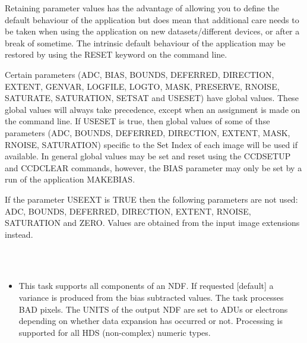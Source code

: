 \documentclass[twoside,11pt]{article}
\newcommand{\htmlref}[2]{#1}
\renewcommand{\_}{\texttt{\symbol{95}}}
\newcommand{\xroutine}[1]{\htmlref{{\sc #1}}{#1}}
\newcommand{\sstimplementationstatus}[1]{
   \item[{Implementation Status:}] \mbox{} \\[1.3ex] #1}
\newcommand{\sstitemlist}[1]{
  \mbox{} \\
  \vspace{-3.5ex}
  \begin{itemize}
     #1
  \end{itemize}
}
\newcommand{\sstitem}{\item}
\newcommand{\sstimplementationstatus}[1]{
      \item[Implementation Status:] #1
   }
\newcommand{\sstitemlist}[1]{
      \begin{itemize}
         #1
      \end{itemize}
      \\
   }
\newcommand{\sstitem}{\item}
\begin{document}
{{{      }
      Retaining parameter values has the advantage of allowing you to
      define the default behaviour of the application but does mean
      that additional care needs to be taken when using the application
      on new datasets/different devices, or after a break of sometime.
      The intrinsic default behaviour of the application may be
      restored by using the RESET keyword on the command line.

      Certain parameters (ADC, BIAS, BOUNDS, DEFERRED, DIRECTION,
      EXTENT, GENVAR, LOGFILE, LOGTO, MASK, PRESERVE, RNOISE, SATURATE,
      SATURATION, SETSAT and USESET) have global values. These global values
      will always take precedence, except when an assignment is made on
      the command line.  If USESET is true, then global values of
      some of thse parameters (ADC, BOUNDS, DEFERRED, DIRECTION, EXTENT,
      MASK, RNOISE, SATURATION) specific to the Set Index of each image
      will be used if available.  In general global values may be set and reset
      using the \xroutine{CCDSETUP} and \xroutine{CCDCLEAR} commands, however, the BIAS
      parameter may only be set by a run of the application \xroutine{MAKEBIAS}.

      If the parameter USEEXT is TRUE then the following parameters
      are not used: ADC, BOUNDS, DEFERRED, DIRECTION, EXTENT, RNOISE,
      SATURATION and ZERO. Values are obtained from the input image
      extensions instead.
   }
   \sstimplementationstatus{
      \sstitemlist{

         \sstitem
         This task supports all components of an NDF. If requested
           [default] a variance is produced from the bias subtracted
           values. The task processes BAD pixels. The UNITS of the output
           NDF are set to ADUs or electrons depending on whether data
           expansion has occurred or not. Processing is supported for all
           HDS (non-complex) numeric types.
      }
   }
}
\end{document}
